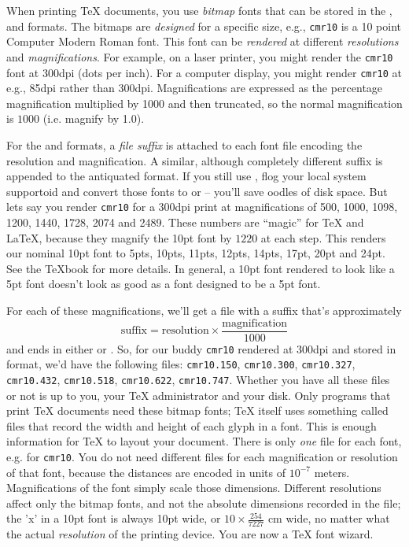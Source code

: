 
When printing {\TeX} documents, you use {\em bitmap} fonts that can be
stored in the {\PK}, {\GF} and {\PXL} formats.
The bitmaps are {\em designed} for a specific size, e.g., {\tt cmr10} is
a 10 point Computer Modern Roman font. This font can be {\em rendered}
at different {\em resolutions} and {\em magnifications}.
For example, on a laser printer, you might render the {\tt cmr10} font
at 300dpi (dots per inch).
For a computer display, you might render {\tt cmr10} at e.g., 85dpi
rather than 300dpi.
Magnifications are expressed as the percentage magnification multiplied
by 1000 and then truncated,
so the normal magnification is $1000$ (i.e. magnify by 1.0).

For the {\GF} and {\PK} formats, a {\em file suffix} is attached to
each font file encoding the resolution and magnification. A similar,
although completely different suffix is appended to the antiquated
{\PXL} format.  If you still use {\PXL}, flog your local system
supportoid and convert those fonts to {\GF} or {\PK} -- you'll save
oodles of disk space.
But lets say you render {\tt cmr10} for a 300dpi print at
magnifications of 500, 1000, 1098, 1200, 1440, 1728, 2074 and 2489.
These numbers are ``magic'' for {\TeX} and {\LaTeX}, because they
magnify the 10pt font by $1220$ at each step.
This renders our nominal 10pt font to 5pts, 10pts, 11pts, 12pts, 14pts,
17pt, 20pt and 24pt. See the {\TeX}book for more details.
In general, a 10pt font rendered to look like a 5pt font doesn't look
as good as a font designed to be a 5pt font.

For each of these magnifications, we'll get a file with a suffix
that's approximately
$$
	\mbox{suffix} = \mbox{resolution} \times
		\frac{\mbox{magnification}}{1000}
$$
and ends in either {\PK} or {\GF}. So, for our buddy {\tt cmr10}
rendered at 300dpi and stored in {\PK} format, we'd have the following files:
\verb|cmr10.150|,
\verb|cmr10.300|,
\verb|cmr10.327|,
\verb|cmr10.432|,
\verb|cmr10.518|,
\verb|cmr10.622|,
\verb|cmr10.747|.
%
Whether you have all these files or not is up to you, your {\TeX}
administrator and your disk.  Only programs that print {\TeX} documents
need these bitmap fonts; {\TeX} itself uses something called {\TFM}
files that record the width and height of each
glyph in a font. This is enough information for {\TeX} to layout your
document. There is only {\em one} {\TFM} file for each font, e.g.  for
{\tt cmr10}. You do not need different {\TFM} files for each
magnification or resolution of that font, because the {\TFM} distances
are encoded in units of $10^{-7}$ meters. Magnifications of the font
simply scale those dimensions.  Different resolutions affect only the
bitmap fonts, and not the absolute dimensions recorded in the {\TFM}
file; the 'x' in a 10pt font is always 10pt wide, or $10 \times
\frac{254}{7227}$ cm wide, no matter what the actual {\em resolution}
of the printing device. You are now a {\TeX} font wizard.

